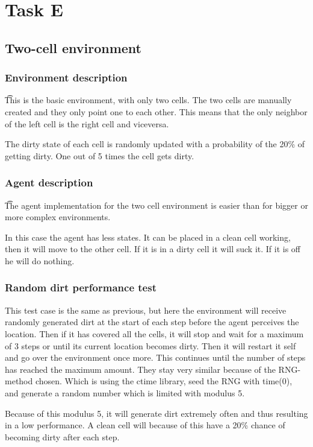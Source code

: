 
\section{Task E}
\subsection{Two-cell environment}
\subsubsection{Environment description}
\t This is the basic environment, with only two cells. The two cells are manually
created and they only point one to each other. This means that the only neighbor
of the left cell is the right cell and viceversa.

The dirty state of each cell is randomly updated with a probability of the 20\% 
of getting dirty. One out of 5 times the cell gets dirty.

\subsubsection{Agent description}
\t The agent implementation for the two cell environment is easier than for
bigger or more complex environments. 

In this case the agent has less states. It can be placed in a clean cell working,
then it will move to the other cell. If it is in a dirty cell it will suck it. 
If it is off he will do nothing.

\subsubsection{Random dirt performance test}
This test case is the same as previous, but here the environment will receive
randomly generated dirt at the start of each step before the agent perceives the
location.  Then if it has covered all the cells, it will stop and wait for
a maximum of 3 steps or until its current location becomes dirty. Then it will
restart it self and go over the environment once more. This continues until the
number of steps has reached the maximum amount.  They stay very similar because
of the RNG-method chosen. Which is using the ctime library, seed the RNG with
time(0), and generate a random number which is limited with modulus 5.

Because of this modulus 5, it will generate dirt extremely often and thus
resulting in a low performance.  A clean cell will because of this have a 20\%
chance of becoming dirty after each step.


